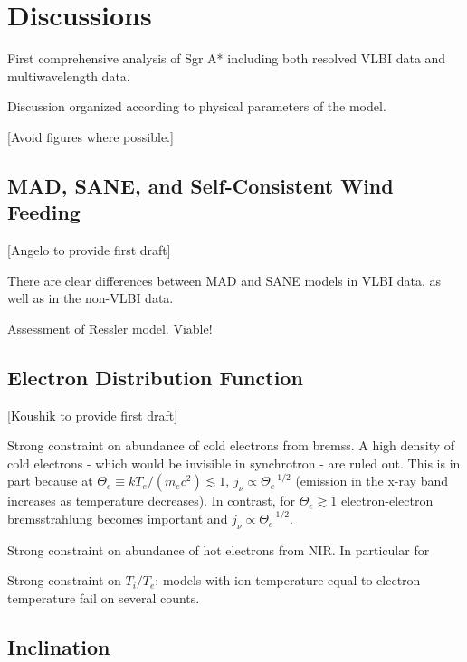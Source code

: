 \section{Discussions}\label{sec:discussions}

First comprehensive analysis of Sgr A* including both resolved VLBI data and multiwavelength data.

Discussion organized according to physical parameters of the model.

[Avoid figures where possible.]


\subsection{MAD, SANE, and Self-Consistent Wind Feeding}

[Angelo to provide first draft]

There are clear differences between MAD and SANE models in VLBI data, as well as in the non-VLBI data.  

Assessment of Ressler model.  Viable!


\subsection{Electron Distribution Function}

[Koushik to provide first draft]

Strong constraint on abundance of cold electrons from bremss.  A high density of cold electrons - which would be invisible in synchrotron - are ruled out.  This is in part because at $\Theta_e \equiv k T_e/(m_e c^2) \lesssim 1$, $j_\nu \propto \Theta_e^{-1/2}$ (emission in the x-ray band increases as temperature decreases).  In contrast, for $\Theta_e \gtrsim 1$ electron-electron bremsstrahlung becomes important and $j_\nu \propto \Theta_e^{+1/2}$.   

Strong constraint on abundance of hot electrons from NIR.  In particular for 

Strong constraint on $T_i/T_e$: models with ion temperature equal to electron temperature fail on several counts.

\subsection{Inclination}

